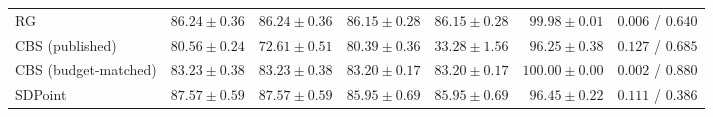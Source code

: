 \begin{table}[!t]
\begin{tabular*}{\linewidth}{@{\extracolsep{\fill}}lrrrrrr@{}}
RG & $86.24\pm0.36$ & $86.24\pm0.36$ & $86.15\pm0.28$ & $86.15\pm0.28$ & $99.98\pm0.01$ & $0.006$ / $0.640$\\
CBS (published) & $80.56\pm0.24$ & $72.61\pm0.51$ & $80.39\pm0.36$ & $33.28\pm1.56$ & $96.25\pm0.38$ & $0.127$ / $0.685$\\
CBS (budget-matched) & $83.23\pm0.38$ & $83.23\pm0.38$ & $83.20\pm0.17$ & $83.20\pm0.17$ & $100.00\pm0.00$ & $0.002$ / $0.880$\\
SDPoint & $87.57\pm0.59$ & $87.57\pm0.59$ & $85.95\pm0.69$ & $85.95\pm0.69$ & $96.45\pm0.22$ & $0.111$ / $0.386$\\
\bottomrule
\end{tabular*}
\end{table}
